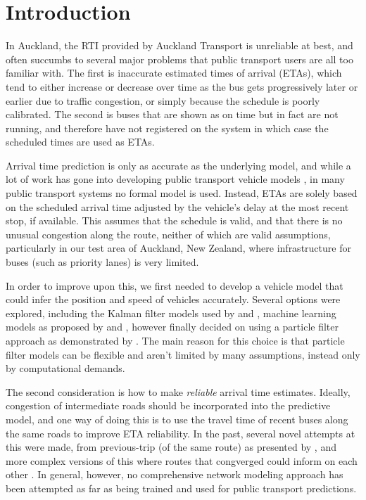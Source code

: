 \section{Introduction}
\label{sec:intro}


In Auckland, the RTI provided by Auckland Transport is unreliable at best,
and often succumbs to several major problems that public transport users
are all too familiar with.
The first is inaccurate estimated times of arrival (ETAs),
which tend to either increase or decrease over time as the bus gets progressively later or earlier
due to traffic congestion, or simply because the schedule is poorly calibrated.
The second is buses that are shown as on time but in fact are not running,
and therefore have not registered on the \rt system in which case the 
scheduled times are used as ETAs.


Arrival time prediction is only as accurate as the underlying model,
and while a lot of work has gone into developing public transport vehicle models
\citep{Cathey_2003,Jeong_2005,Yu_2011,Hans_2015},
in many public transport systems no formal model is used.
Instead, ETAs are solely based on the scheduled arrival time
adjusted by the vehicle's delay at the most recent stop, if available.
This assumes that the schedule is valid,
and that there is no unusual congestion along the route,
neither of which are valid assumptions,
particularly in our test area of Auckland, New Zealand,
where infrastructure for buses (such as priority lanes) is very limited.


In order to improve upon this, we first needed to develop a vehicle model
that could infer the position and speed of vehicles accurately.
Several options were explored, 
including the Kalman filter models used by \cite{Dailey_2001} and \cite{Cathey_2003},
machine learning models as proposed by \cite{Yu_2006} and \cite{Chang_2010},
however finally decided on using a particle filter approach as demonstrated
by \cite{Hans_2015}.
The main reason for this choice is that particle filter models can be 
flexible and aren't limited by many assumptions,
instead only by computational demands.


The second consideration is how to make \emph{reliable} arrival time estimates.
Ideally, congestion of intermediate roads should be incorporated into the predictive model,
and one way of doing this is to use the travel time of recent buses along
the same roads to improve ETA reliability.
In the past, several novel attempts at this were made,
from previous-trip (of the same route) as presented by \cite{Yu_2010},
and more complex versions of this where routes that congverged could
inform on each other \citep{Yu_2011}.
In general, however, no comprehensive network modeling approach has been attempted
as far as being trained and used for public transport predictions.


